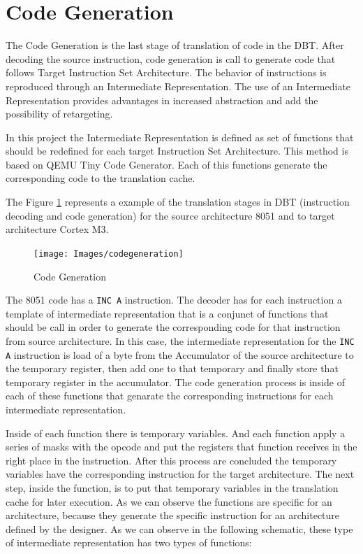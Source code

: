 \documentclass[11pt]{report}
\begin{document}
	
	\section{Code Generation}
	The Code Generation is the last stage of translation of code in the DBT. After decoding the source instruction, code generation is call to generate code that follows Target Instruction Set Architecture. The behavior of instructions is reproduced through an Intermediate Representation. The use of an Intermediate Representation provides advantages in increased abstraction and add the possibility of retargeting.
	
	In this project the Intermediate Representation is defined as set of functions that should be redefined for each target Instruction Set Architecture. This method is based on QEMU Tiny Code Generator. Each of this functions generate the corresponding code to the translation cache. 
	
	The Figure \ref{fig:generation} represents a example of the translation stages in DBT (instruction decoding and code generation) for the source architecture 8051 and to target architecture Cortex M3.
	
	\begin{figure} [H]
		\centering
		\texttt{[image: Images/codegeneration]}
		\caption{Code Generation}
		\label{fig:generation}
	\end{figure}	
	
	The 8051 code has a \texttt{INC A} instruction. The decoder has for each instruction a template of intermediate representation that is a conjunct of functions that should be call in order to generate the corresponding code for that instruction from source architecture. In this case, the intermediate representation for  the \texttt{INC A} instruction is load of a byte from the Accumulator of the source architecture to the temporary register, then add one to that temporary and finally store that temporary register in the accumulator. The code generation process is inside of each of these functions that genarate the corresponding instructions for each intermediate representation.
	
	Inside of each function there is temporary variables. And each function apply a series of masks with the opcode and put the registers that function receives in the right place in the instruction. After this process are concluded the temporary variables have the corresponding instruction for the target architecture. The next step, inside the function, is to put that temporary variables in the translation cache for later execution. As we can observe the functions are specific for an architecture, because they generate the specific instruction for an architecture defined by the designer. 
	\newpage
	As we can observe in the following schematic, these type of intermediate representation has two types of functions:
	
\end{document}
